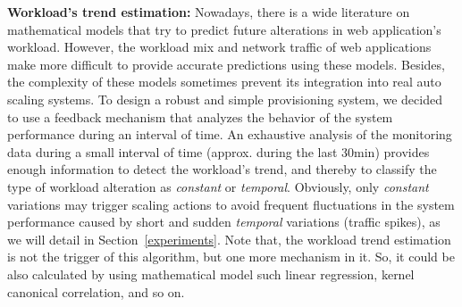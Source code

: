 \textbf{Workload's trend estimation:} Nowadays, there is a wide literature on mathematical models that try to predict future alterations in web application's workload. However, the workload mix and network traffic of web applications make more difficult to provide accurate predictions using these models. Besides, the complexity of these models sometimes prevent its integration into real auto scaling systems. To design a robust and simple provisioning system, we decided to use a feedback mechanism that analyzes the behavior of the system performance during an interval of time. An exhaustive analysis of the monitoring data during a small interval of time (approx. during the last 30min) provides enough information to detect the workload's trend, and thereby to classify the type of workload alteration as \emph{constant} or \emph{temporal}. Obviously, only \emph{constant} variations may trigger scaling actions to avoid frequent fluctuations in the system performance caused by short and sudden \emph{temporal} variations (traffic spikes), as we will detail in Section~\ref{experiments}. Note that, the workload trend estimation is not the trigger of this algorithm, but one more mechanism in it. So, it could be also calculated by using mathematical model such linear regression, kernel canonical correlation, and so on.


\vspace{3mm}

